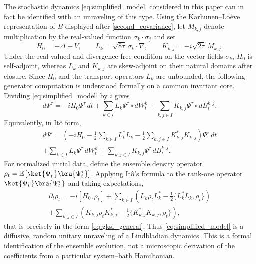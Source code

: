 \documentclass[a4paper,10pt]{amsart}
\newcommand{\expt}[1]{\mathbb{E}\left[#1\right]}
\theoremstyle{remark}
\numberwithin{equation}{section}
\begin{document}
The stochastic dynamics \eqref{eq:simplified_model} considered in this paper can in fact be identified with an unraveling of this type. Using the Karhunen--Lo\`eve representation of $B$ displayed after \eqref{second_covariance}, let $M_{k,j}$ denote multiplication by the real-valued function $\sigma_k\cdot\sigma_j$ and set
\begin{equation*}
    H_0=-\Delta+V,\qquad
    L_k=\sqrt{8\tau}\,\sigma_k\cdot\nabla,\qquad
    K_{k,j}=-i\sqrt{2\tau}\,M_{k,j}.
\end{equation*}
Under the real-valued and divergence-free condition on the vector fields $\sigma_k$, $H_0$ is self-adjoint, whereas $L_k$ and $K_{k,j}$ are skew-adjoint on their natural domains after closure. Since $H_0$ and the transport operators $L_k$ are unbounded, the following generator computation is understood formally on a common invariant core. Dividing \eqref{eq:simplified_model} by $i$ gives
\begin{equation*}
    d\Psi^\tau
    =-iH_0\Psi^\tau\,dt
    +\sum_{k\in I}L_k\Psi^\tau\circ dW_t^k
    +\sum_{k,j\in I}K_{k,j}\Psi^\tau\circ dB_t^{k,j}.
\end{equation*}
Equivalently, in It\^o form,
\begin{multline*}
    d\Psi^\tau
    =\left(
        -iH_0
        -\frac12\sum_{k\in I}L_k^*L_k
        -\frac12\sum_{k,j\in I}K_{k,j}^*K_{k,j}
    \right)\Psi^\tau\,dt\\
    +\sum_{k\in I}L_k\Psi^\tau\,dW_t^k
    +\sum_{k,j\in I}K_{k,j}\Psi^\tau\,dB_t^{k,j}.
\end{multline*}
For normalized initial data, define the ensemble density operator $\rho_t=\expt{\ket{\Psi_t^\tau}\bra{\Psi_t^\tau}}$. Applying It\^o's formula to the rank-one operator $\ket{\Psi_t^\tau}\bra{\Psi_t^\tau}$ and taking expectations,
\begin{multline*}
    \partial_t\rho_t
    =-i[H_0,\rho_t]
    +\sum_{k\in I}\left(
        L_k\rho_tL_k^*
        -\frac12\{L_k^*L_k,\rho_t\}
    \right)\\
    +\sum_{k,j\in I}\left(
        K_{k,j}\rho_tK_{k,j}^*
        -\frac12\{K_{k,j}^*K_{k,j},\rho_t\}
    \right),
\end{multline*}
that is precisely in the form \eqref{eq:gksl_general}. 
Thus \eqref{eq:simplified_model} is a diffusive, random unitary unraveling of a Lindbladian dynamics. This is a formal identification of the ensemble evolution, not a microscopic derivation of the coefficients from a particular system--bath Hamiltonian.
\end{document}
